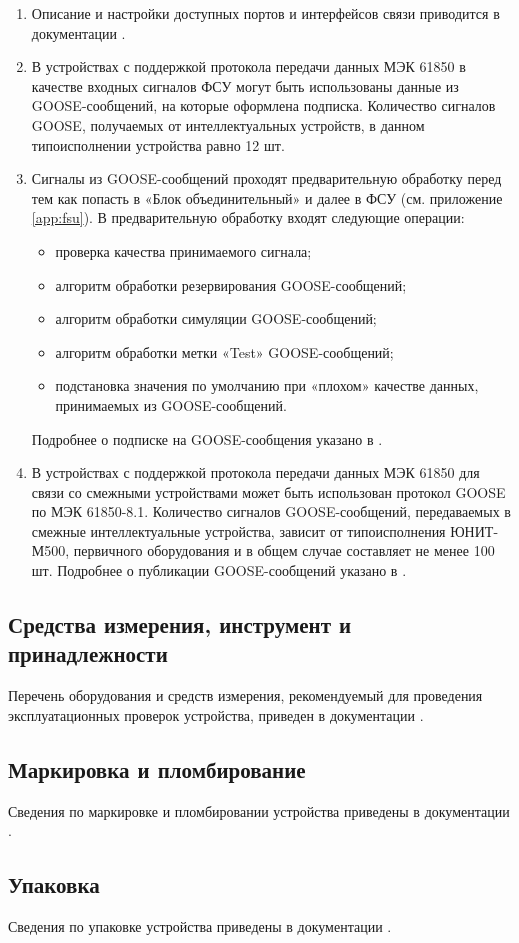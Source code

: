 \begin{enumerate}
\item \sloppy Описание и настройки доступных портов и интерфейсов связи приводится в документации \ManualUnitGeneral.
\item В устройствах с поддержкой протокола передачи данных МЭК 61850 в качестве входных сигналов ФСУ могут быть использованы данные из GOOSE-сообщений, на которые оформлена подписка.
Количество сигналов GOOSE, получаемых от интеллектуальных устройств, в данном типоисполнении устройства равно 12 шт.
\item Сигналы из GOOSE-сообщений проходят предварительную обработку перед тем как попасть в «Блок объединительный» и далее в ФСУ (см. приложение \ref{app:fsu}).
В предварительную обработку входят следующие операции:
\begin{itemize}
\item проверка качества принимаемого сигнала;
\item алгоритм обработки резервирования GOOSE-сообщений;
\item алгоритм обработки симуляции GOOSE-сообщений;
\item алгоритм обработки метки «Test» GOOSE-сообщений;
\item подстановка значения по умолчанию при «плохом» качестве данных, принимаемых из GOOSE-сообщений.
\end{itemize}
Подробнее о подписке на GOOSE-сообщения указано в \ManualUnitSRZA.
\item В устройствах с поддержкой протокола передачи данных МЭК 61850 для связи со смежными устройствами может быть использован протокол GOOSE по МЭК 61850-8.1.
Количество сигналов GOOSE-сообщений, передаваемых в смежные интеллектуальные устройства, зависит от типоисполнения ЮНИТ-М500, первичного оборудования и в общем случае составляет не менее 100 шт.
Подробнее о публикации GOOSE-сообщений указано в \ManualUnitSRZA.
\end{enumerate}

{\color{unidarkgreen}\subsection{Средства измерения, инструмент и принадлежности}}
Перечень оборудования и средств измерения, рекомендуемый для проведения эксплуатационных проверок устройства, приведен в документации \ManualUnitGeneral.

{\color{unidarkgreen}\subsection{Маркировка и пломбирование}}
Сведения по маркировке и пломбировании устройства приведены в документации \ManualUnitGeneral.

{\color{unidarkgreen}\subsection{Упаковка}}
Сведения по упаковке устройства приведены в документации \ManualUnitGeneral.
